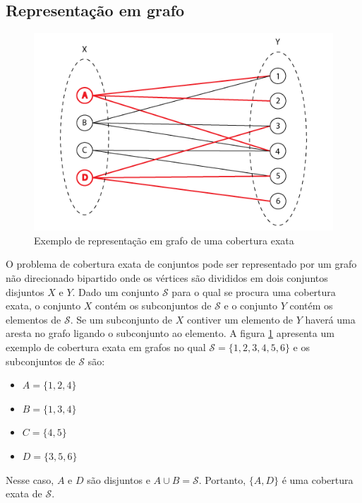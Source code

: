 \documentclass{article}
\begin{document}
\subsection{Representação em grafo}

\begin{figure}
  \includegraphics[width=\linewidth]{graph.png}
  \caption{Exemplo de representação em grafo de uma cobertura exata}
  \label{fig:graph}
\end{figure}

O problema de cobertura exata de conjuntos pode ser representado por um grafo não direcionado bipartido onde os vértices são
divididos em dois conjuntos disjuntos $ X $ e $ Y $. Dado um conjunto $ \mathcal{S} $ para o qual se procura uma cobertura exata,
o conjunto $ X $ contém os subconjuntos de $ \mathcal{S} $ e o conjunto $ Y $ contém
os elementos de $ \mathcal{S} $. Se um subconjunto de $ X $ contiver um elemento de $ Y $ haverá uma aresta no grafo ligando o subconjunto
ao elemento. A figura \ref{fig:graph} apresenta um exemplo de cobertura exata em grafos no qual $ \mathcal{S} = \{ 1, 2, 3, 4, 5, 6 \} $
e os subconjuntos de $ \mathcal{S} $ são:

\begin{itemize}
\item $ A = \{ 1, 2, 4 \} $
\item $ B = \{ 1, 3, 4 \} $
\item $ C = \{ 4, 5 \} $
\item $ D = \{ 3, 5, 6 \} $
\end{itemize}

Nesse caso, $ A $ e $ D $ são disjuntos e $ A \cup B = \mathcal{S} $. Portanto, $ \{ A, D \} $ é uma cobertura exata de $ \mathcal{S} $.
\end{document}
